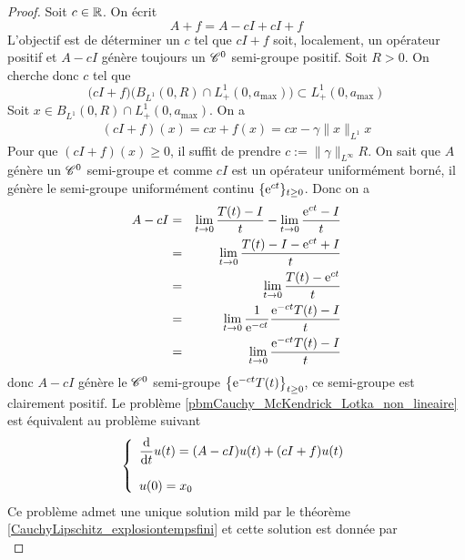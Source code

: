 \begin{proof}
    Soit $c \in \mathbb{R}$. On écrit 
    \begin{equation*}
        A+f = A-cI + cI +f
    \end{equation*}
    L'objectif est de déterminer un $c$ tel que $cI+f$ soit, localement, un opérateur positif et $A-cI$ génère toujours un $\mathscr{C}^0$ semi-groupe positif. Soit $R>0$. On cherche donc $c$ tel que 
    \begin{equation*}
        \big(cI+f\big)\big(B_{L^1}(0,R)\cap L^1_+(0,a_{\max})\big) \subset L^1_+(0,a_{\max})
    \end{equation*}
    Soit $x \in B_{L^1}(0,R)\cap L^1_+(0,a_{\max})$. On a 
    \begin{eqnarray*}
        (cI+f)(x) = cx+f(x) = cx-\gamma\|x\|_{L^1}x
    \end{eqnarray*}
    Pour que $(cI+f)(x) \geq 0$, il suffit de prendre $c:=\|\gamma\|_{L^\infty}R$. On sait que $A$ génère un $\mathscr{C}^0$ semi-groupe et comme $cI$ est un opérateur uniformément borné, il génère le semi-groupe uniformément continu $\{\mathrm{e}^{ct}\}_{t\geq 0}$. Donc on a 
    \begin{eqnarray*}
        A-cI &=&\lim_{t \to 0}\frac{T(t)-I}{t} - \lim_{t \to 0} \frac{\mathrm{e}^{ct}-I}{t} \\
        &=& \lim_{t \to 0} \frac{T(t)-I-\mathrm{e}^{ct}+I}{t} \\
        &=& \lim_{t \to 0} \frac{T(t)-\mathrm{e}^{ct}}{t} \\
        &=& \lim_{t \to 0} \frac{1}{\mathrm{e}^{-ct}}\frac{\mathrm{e}^{-ct}T(t)-I}{t} \\
        &=& \lim_{t \to 0} \frac{\mathrm{e}^{-ct}T(t)-I}{t}
    \end{eqnarray*}
    donc $A-cI$ génère le $\mathscr{C}^0$ semi-groupe $\big\{\mathrm{e}^{-ct}T(t)\big\}_{t \geq 0}$, ce semi-groupe est clairement positif. Le problème \eqref{pbmCauchy_McKendrick_Lotka_non_lineaire} est équivalent au problème suivant 
    \begin{equation*}
        \left\{\begin{array}{l}
        \dfrac{\mathrm{d}}{\mathrm{d} t}u(t) = (A-cI)u(t) + (cI+f)u(t) \\
        \\
        u(0) = x_0
    \end{array}\right.
    \end{equation*}
    Ce problème admet une unique solution mild par le théorème \ref{CauchyLipschitz_explosiontempsfini} et cette solution est donnée par 
    \begin{equation*}

\end{equation*}
\end{proof}
